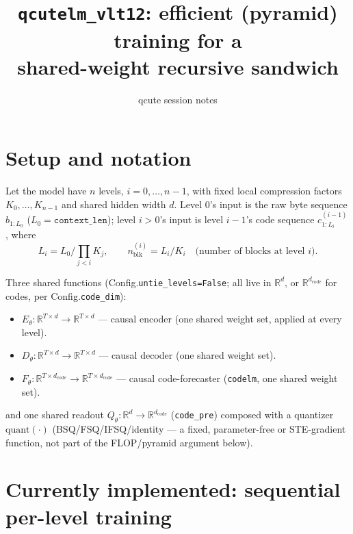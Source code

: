 \documentclass[11pt]{article}
\title{\texttt{qcutelm\_vlt12}: efficient (pyramid) training for a\\
shared-weight recursive sandwich}
\author{qcute session notes}
\date{}
\begin{document}
\maketitle

\section{Setup and notation}

Let the model have $n$ levels, $i = 0, \dots, n-1$, with fixed local
compression factors $K_0, \dots, K_{n-1}$ and shared hidden width
$d$. Level $0$'s input is the raw byte sequence $b_{1:L_0}$
($L_0 = \texttt{context\_len}$); level $i>0$'s input is level
$i-1$'s code sequence $c^{(i-1)}_{1:L_i}$, where
\[
  L_i = L_0 \Big/ \prod_{j<i} K_j, \qquad
  n^{(i)}_{\text{blk}} = L_i / K_i \quad \text{(number of blocks at level $i$).}
\]

Three shared functions (Config.\texttt{untie\_levels=False}; all live in
$\mathbb{R}^d$, or $\mathbb{R}^{d_{\text{code}}}$ for codes, per
Config.\texttt{code\_dim}):
\begin{itemize}
  \item $E_\theta: \mathbb{R}^{T \times d} \to \mathbb{R}^{T \times d}$ — causal
        encoder (one shared weight set, applied at every level).
  \item $D_\theta: \mathbb{R}^{T \times d} \to \mathbb{R}^{T \times d}$ — causal
        decoder (one shared weight set).
  \item $F_\theta: \mathbb{R}^{T \times d_{\text{code}}} \to \mathbb{R}^{T \times
        d_{\text{code}}}$ — causal code-forecaster (\texttt{codelm}, one shared
        weight set).
\end{itemize}
and one shared readout $Q_\theta: \mathbb{R}^d \to \mathbb{R}^{d_{\text{code}}}$
(\texttt{code\_pre}) composed with a quantizer $\mathrm{quant}(\cdot)$
(BSQ/FSQ/IFSQ/identity — a fixed, parameter-free or STE-gradient function,
not part of the FLOP/pyramid argument below).

\section{Currently implemented: sequential per-level training}
\end{document}
